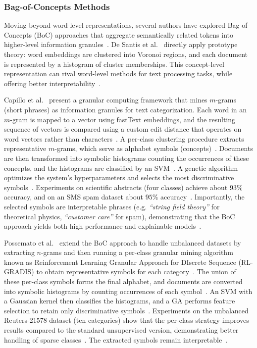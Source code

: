 \documentclass[a4paper,twoside,12pt]{book}
\newcommand{\literal}[1]{\textit{``#1''}}
\begin{document}
\subsubsection{Bag-of-Concepts Methods}

Moving beyond word-level representations, several authors have explored Bag-of-Concepts (BoC) approaches that aggregate semantically related tokens into higher-level information granules~\cite{Capillo2020mining, DeSantis2023prototype, Possemato2013AutomaticTC}. De Santis et al.~\cite{DeSantis2023prototype} directly apply prototype theory: word embeddings are clustered into Voronoi regions, and each document is represented by a histogram of cluster memberships. This concept-level representation can rival word-level methods for text processing tasks, while offering better interpretability~\cite{DeSantis2023prototype}.

Capillo et al.~\cite{Capillo2020mining} present a granular computing framework that mines $m$-grams (short phrases) as information granules for text categorization. Each word in an $m$-gram is mapped to a vector using fastText embeddings, and the resulting sequence of vectors is compared using a custom edit distance that operates on word vectors rather than characters~\cite{Capillo2020mining}. A per-class clustering procedure extracts representative $m$-grams, which serve as alphabet symbols (concepts)~\cite{Capillo2020mining}. Documents are then transformed into symbolic histograms counting the occurrences of these concepts, and the histograms are classified by an SVM~\cite{Capillo2020mining}. A genetic algorithm optimizes the system's hyperparameters and selects the most discriminative symbols~\cite{Capillo2020mining}. Experiments on scientific abstracts (four classes) achieve about $93\%$ accuracy, and on an SMS spam dataset about $95\%$ accuracy~\cite{Capillo2020mining}. Importantly, the selected symbols are interpretable phrases (e.g. \literal{string field theory} for theoretical physics, \literal{customer care} for spam), demonstrating that the BoC approach yields both high performance and explainable models~\cite{Capillo2020mining}.

Possemato et al.~\cite{Possemato2013AutomaticTC} extend the BoC approach to handle unbalanced datasets by extracting $n$-grams and then running a per-class granular mining algorithm known as Reinforcement Learning Granular Approach for DIscrete
Sequence (RL-GRADIS) to obtain representative symbols for each category~\cite{Possemato2013AutomaticTC}. The union of these per-class symbols forms the final alphabet, and documents are converted into symbolic histograms by counting occurrences of each symbol~\cite{Possemato2013AutomaticTC}. An SVM with a Gaussian kernel then classifies the histograms, and a GA performs feature selection to retain only discriminative symbols~\cite{Possemato2013AutomaticTC}. Experiments on the unbalanced Reuters-21578 dataset (ten categories) show that the per-class strategy improves results compared to the standard unsupervised version, demonstrating better handling of sparse classes~\cite{Possemato2013AutomaticTC}. The extracted symbols remain interpretable~\cite{Possemato2013AutomaticTC}.
\end{document}
